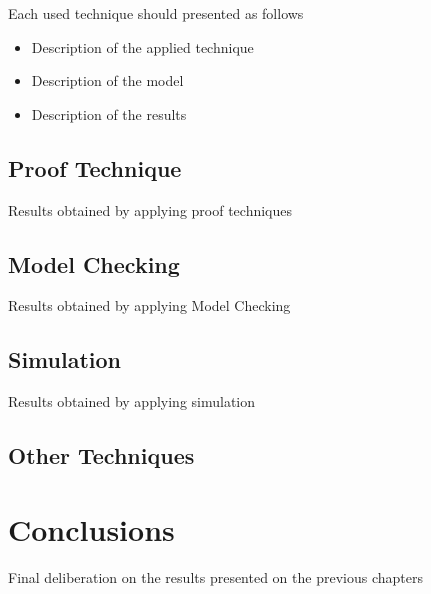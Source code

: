 \documentclass{template/openetcs_article}
\begin{document}
Each used technique should presented as follows

\begin{itemize}
\item Description of the applied technique
\item Description of the model
\item Description of the results
\end{itemize}

\subsection{Proof Technique}

Results obtained by applying proof techniques

\subsection{Model Checking}

Results obtained by applying Model Checking

\subsection{Simulation}

Results obtained by applying simulation

\subsection{Other Techniques}

\section*{Conclusions}

Final deliberation on the results presented on the previous chapters
\nocite{*}
\end{document}
